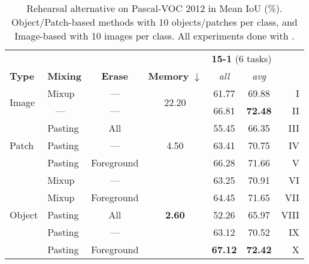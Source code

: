 \begin{table}[t]
    \centering
    \caption{Rehearsal alternative on Pascal-VOC 2012 in Mean IoU (\%). Object/Patch-based methods with 10 objects/patches per class, and Image-based with 10 images per class. All experiments done with \ourslong.}
    \vspace*{-0.3cm}
    \label{tab:rehearsal_alternative}
    \begin{tabular}{@{}llc|c|cc|r@{}}
        \toprule
                                &                 &                &                                & \multicolumn{2}{c}{\textbf{15-1} (6 tasks)}                         \\
        \textbf{Type}           & \textbf{Mixing} & \textbf{Erase} & \textbf{Memory} $\downarrow$   & \textit{all}                                & \textit{avg}   &      \\
        \midrule
        \multirow{2}{*}{Image}  & Mixup           & ---            & \multirow{2}{*}{22.20}         & 61.77                                       & 69.88          & I    \\
                                & \,\,\,\,\,---   & ---            &                                & 66.81                                       & \textbf{72.48} & II   \\
        \hline
        \multirow{3}{*}{Patch}  & Pasting         & All            & \multirow{3}{*}{4.50}          & 55.45                                       & 66.35          & III  \\
                                & Pasting         & ---            &                                & 63.41                                       & 70.75          & IV   \\
                                & Pasting         & Foreground     &                                & 66.28                                       & 71.66          & V    \\
        \hline
        \multirow{5}{*}{Object} & Mixup           & ---            & \multirow{5}{*}{\textbf{2.60}} & 63.25                                       & 70.91          & VI   \\
                                & Mixup           & Foreground     &                                & 64.45                                       & 71.65          & VII  \\
                                & Pasting         & All            &                                & 52.26                                       & 65.97          & VIII \\
                                & Pasting         & ---            &                                & 63.12                                       & 70.52          & IX   \\
                                & Pasting         & Foreground     &                                & \textbf{67.12}                              & \textbf{72.42} & X    \\
        \bottomrule
    \end{tabular}
\end{table}
